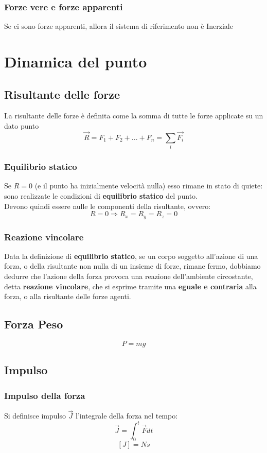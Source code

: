 \documentclass[a4paper]{report}
\begin{document}
  \subsection{Forze vere e forze apparenti}
  Se ci sono forze apparenti, allora il sistema di riferimento non è Inerziale

  \chapter{Dinamica del punto}

  \section{Risultante delle forze}
  La risultante delle forze è definita come la somma di tutte le forze applicate su un dato punto
  \[ \vec{R} = F_1 + F_2 + ... + F_n = \sum_{i} \vec{F_i} \]

  \subsection{Equilibrio statico}
  Se $R = 0$ (e il punto ha inizialmente velocità nulla) esso rimane in stato di quiete: sono realizzate le condizioni di \textbf{equilibrio statico} del punto.\\
  Devono quindi essere nulle le componenti della risultante, ovvero:
  \[ R = 0 \Rightarrow R_x = R_y = R_z = 0 \]

  \subsection{Reazione vincolare}
  Data la definizione di \textbf{equilibrio statico}, se un corpo soggetto all'azione di una forza, o della risultante non nulla di un insieme di forze, rimane fermo, dobbiamo dedurre che l'azione della forza provoca una reazione dell'ambiente circostante, detta \textbf{reazione vincolare}, che si esprime tramite una \textbf{eguale e contraria} alla forza, o alla risultante delle forze agenti.

  \section{Forza Peso}
  \[ P = mg \]

  \section{Impulso}
  \subsection{Impulso della forza}
  Si definisce impulso $ \vec{J} $ l'integrale della forza nel tempo:
  \[ \vec{J} = \int_0^t \vec{F} dt \]
  \[ [J] = N  s \]
\end{document}
